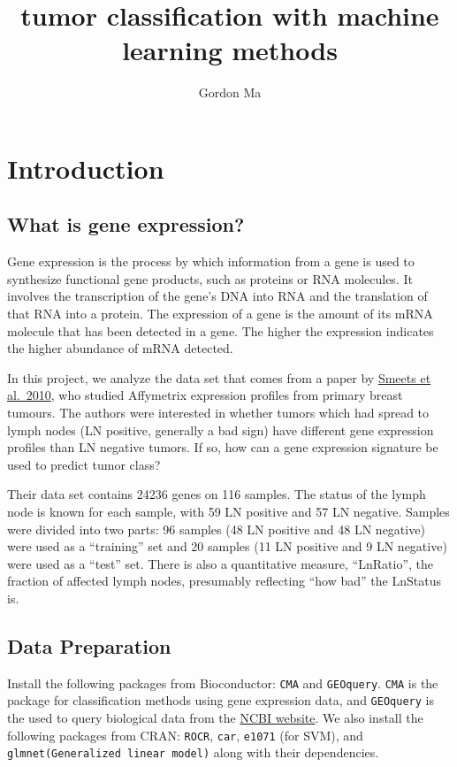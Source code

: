 \documentclass[
]{article}
\title{tumor classification with machine learning methods}
\author{Gordon Ma}
\date{}
\begin{document}
\maketitle

\hypertarget{introduction}{%
\section{Introduction}\label{introduction}}

\hypertarget{what-is-gene-expression}{%
\subsection{What is gene expression?}\label{what-is-gene-expression}}

Gene expression is the process by which information from a gene is used
to synthesize functional gene products, such as proteins or RNA
molecules. It involves the transcription of the gene's DNA into RNA and
the translation of that RNA into a protein. The expression of a gene is
the amount of its mRNA molecule that has been detected in a gene. The
higher the expression indicates the higher abundance of mRNA detected.

In this project, we analyze the data set that comes from a paper by
\href{http://www.ncbi.nlm.nih.gov/geo/query/acc.cgi?acc=GSE23177}{Smeets
et al.~2010}, who studied Affymetrix expression profiles from primary
breast tumours. The authors were interested in whether tumors which had
spread to lymph nodes (LN positive, generally a bad sign) have different
gene expression profiles than LN negative tumors. If so, how can a gene
expression signature be used to predict tumor class?

Their data set contains 24236 genes on 116 samples. The status of the
lymph node is known for each sample, with 59 LN positive and 57 LN
negative. Samples were divided into two parts: 96 samples (48 LN
positive and 48 LN negative) were used as a ``training'' set and 20
samples (11 LN positive and 9 LN negative) were used as a ``test'' set.
There is also a quantitative measure, ``LnRatio'', the fraction of
affected lymph nodes, presumably reflecting ``how bad'' the LnStatus is.

\hypertarget{data-preparation}{%
\subsection{Data Preparation}\label{data-preparation}}

Install the following packages from Bioconductor: \texttt{CMA} and
\texttt{GEOquery}. \texttt{CMA} is the package for classification
methods using gene expression data, and \texttt{GEOquery} is the used to
query biological data from the \href{https://www.ncbi.nlm.nih.gov/}{NCBI
website}. We also install the following packages from CRAN:
\texttt{ROCR}, \texttt{car}, \texttt{e1071} (for SVM), and
\texttt{glmnet(Generalized\ linear\ model)} along with their
dependencies.
\end{document}
